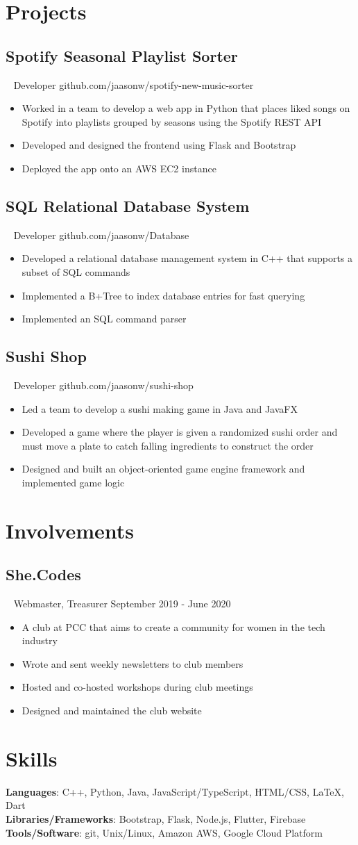 \documentclass{article}
\newcommand{\resumesection}[3]{
    \subsection*{#1}
    \ 
    \footnotesize
    \textcolor{csufgrey}{#2}
    \footnotesize
    \hfill
    \textcolor{csufgrey}{#3}
    \normalsize
}
\begin{document}
\section*{Projects}
\resumesection{Spotify Seasonal Playlist Sorter}{Developer}{github.com/jaasonw/spotify-new-music-sorter}
\begin{itemize}
    \item Worked in a team to develop a web app in Python that places liked songs on Spotify into playlists grouped by seasons using the Spotify REST API
    \item Developed and designed the frontend using Flask and Bootstrap
    \item Deployed the app onto an AWS EC2 instance
\end{itemize}

\resumesection{SQL Relational Database System}{Developer}{github.com/jaasonw/Database}
\begin{itemize}
    \item Developed a relational database management system in C++ that supports a subset of SQL commands
    \item Implemented a B+Tree to index database entries for fast querying
    \item Implemented an SQL command parser
\end{itemize}

\resumesection{Sushi Shop}{Developer}{github.com/jaasonw/sushi-shop}
\begin{itemize}
    \item Led a team to develop a sushi making game in Java and JavaFX
    \item Developed a game where the player is given a randomized sushi order and must move a plate to catch falling ingredients to construct the order
    \item Designed and built an object-oriented game engine framework and implemented game logic
\end{itemize}
\hfill
\section*{Involvements}
\resumesection{She.Codes}{Webmaster, Treasurer}{September 2019 - June 2020}
\begin{itemize}
    \item A club at PCC that aims to create a community for women in the tech industry
    \item Wrote and sent weekly newsletters to club members
    \item Hosted and co-hosted workshops during club meetings
    \item Designed and maintained the club website
\end{itemize}
\hfill
\section*{Skills}
\textbf{Languages}: C++, Python, Java, JavaScript/TypeScript, HTML/CSS, {\selectfont\LaTeX}, Dart\\
\textbf{Libraries/Frameworks}: Bootstrap, Flask, Node.js, Flutter, Firebase\\
\textbf{Tools/Software}: git, Unix/Linux, Amazon AWS, Google Cloud Platform
\end{document}
